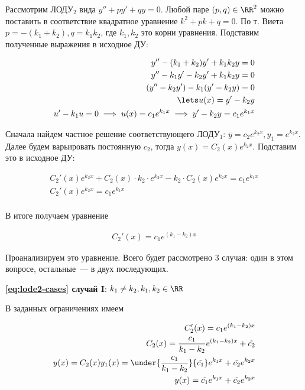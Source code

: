 Рассмотрим ЛОДУ\(_2\) вида \(y'' + p y' + q y = 0\). Любой паре
\((p, q) \in \RR^{2}\) можно поставить в соответствие квадратное уравнение
\(k^2 + pk + q = 0\). По т. Виета \(p = -(k_{1} + k_{2}), q = k_{1} k_{2}\), где
\(k_{1}, k_{2}\) это корни уравнения. Подставим полученные выражения в исходное
ДУ:

\begin{align*}
  y'' - (k_{1} + k_{2}) y' + k_{1} k_{2} y = 0 \\
  y'' - k_{1} y' - k_{2} y' + k_{1} k_{2} y = 0 \\
  (y'' - k_{2} y') - k_{1} (y' - k_{2}y) = 0 \\
  \lets u(x) =  y' - k_{2} y \\
  u' - k_{1} u = 0
  \implies u(x) = c_1  e^{k_{1} x}
  \implies y' - k_{2} y = c_1  e^{k_{1} x}
\end{align*}

Сначала найдем частное решение соответствующего ЛОДУ\(_1\):
\(\overline{y} = c_{2} e^{k_{2} x}, y_{1} = e^{k_{2} x}\). Далее будем 
варьировать постоянную \(c_{2}\), тогда \(y(x) = C_{2}(x) e^{k_{2} x}\).
Подставим это в исходное ДУ:

\begin{align*}
  C_{2}'(x) e^{k_{2} x} + C_{2}(x) \cdot k_{2} \cdot e^{k_{2} x}
  - k_{2} \cdot C_{2}(x) e^{k_{2} x} = c_{1} e^{k_{1} x} \\
  C_{2}'(x) e^{k_{2} x} = c_{1} e^{k_{1} x} \\
\end{align*}

В итоге получаем уравнение

\begin{align*}\label{eq:lode2-cases}\tag{\(\bigstar\)}
  \boxed{C_{2}'(x) = c_{1} e^{(k_{1} - k_{2}) x}}
\end{align*}

Проанализируем это уравнение. Всего будет рассмотрено 3
случая: один в этом вопросе, остальные~--- в двух последующих.

\textbf{\eqref{eq:lode2-cases} случай I}:
\(k_{1} \neq k_{2}, k_{1}, k_{2} \in \RR\)

В заданных ограничениях имеем

\begin{align*}
  C_{2}'(x) = c_{1} e^{(k_{1} - k_{2}) x} \\
  C_{2}(x) = \frac{c_1}{k_{1} - k_{2}} e^{(k_{1} - k_{2}) x} + \tilde{c_{2}} \\
  y(x)
  = C_{2}(x) y_{1}(x)
  = \under{\frac{c_1}{k_{1} - k_{2}}}{\tilde{c_1}} e^{k_{1} x}
  + \tilde{c_2} e^{k_{2} x} \\
  y(x) = \tilde{c_{1}} e^{k_{1}x} + \tilde{c_{2}} e^{k_{2}x}
\end{align*}



